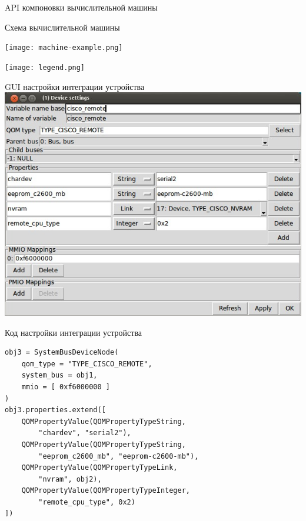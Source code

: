 \documentclass[unicode,hyperref={unicode=true}]{beamer}
\theoremstyle{definition}
\theoremstyle{plain}
\begin{document}
\begin{frame}[fragile]{API компоновки вычислительной машины}

\end{frame}



\begin{frame}{Схема вычислительной машины}
\begin{minipage}[b]{0.71\textwidth}
\texttt{[image: machine-example.png]}
\vfill
\end{minipage}
\hfill
\begin{minipage}[t]{0.24\textwidth}
\vfill
\texttt{[image: legend.png]}
\end{minipage}
\end{frame}



\begin{frame}{GUI настройки интеграции устройства}
\includegraphics[height=0.9\textheight]{REMOTE.jpg}
\end{frame}



\begin{frame}[fragile]{Код настройки интеграции устройства}

\lstset{language=Python}
\begin{lstlisting}
obj3 = SystemBusDeviceNode(
    qom_type = "TYPE_CISCO_REMOTE",
    system_bus = obj1,
    mmio = [ 0xf6000000 ]
)
obj3.properties.extend([
    QOMPropertyValue(QOMPropertyTypeString,
        "chardev", "serial2"),
    QOMPropertyValue(QOMPropertyTypeString,
        "eeprom_c2600_mb", "eeprom-c2600-mb"),
    QOMPropertyValue(QOMPropertyTypeLink,
        "nvram", obj2),
    QOMPropertyValue(QOMPropertyTypeInteger,
        "remote_cpu_type", 0x2)
])
\end{lstlisting}

\end{frame}
\end{document}
